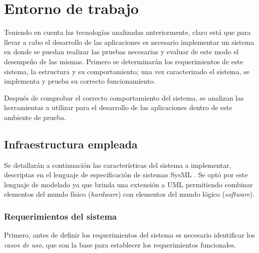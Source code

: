 
\chapter{Entorno de trabajo} %

\label{Chapter4} %
Teniendo en cuenta las tecnologías analizadas anteriormente, claro está que para llevar a cabo el desarrollo de las aplicaciones es necesario implementar un sistema en donde se puedan realizar las pruebas necesarias y evaluar de este modo el desempeño de las mismas. Primero se determinarán los requerimientos de este sistema, la estructura y su comportamiento; una vez caracterizado el sistema, se implementa y prueba su correcto funcionamiento. 

Después de comprobar el correcto comportamiento del sistema, se analizan las herramientas a utilizar para el desarrollo de las aplicaciones dentro de este ambiente de prueba. 


\section{Infraestructura empleada}
Se detallarán a continuación las características del sistema a implementar, descriptas en el lenguaje de especificación de sistemas SysML \parencite{sysml}. Se optó por este lenguaje de modelado ya que brinda una extensión a UML permitiendo combinar elementos del mundo físico (\textit{hardware}) con elementos del mundo lógico (\textit{software}). 


\subsection{Requerimientos del sistema}

Primero, antes de definir los requerimientos del sistema es necesario identificar los \textit{casos de uso}, que son la base para establecer los requerimientos funcionales. 

